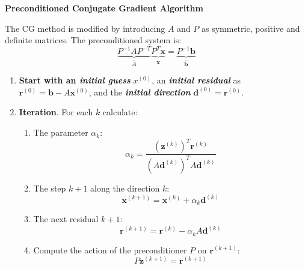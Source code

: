 \newpage

\begin{flushleft}
    \textcolor{Green3}{ \textbf{Preconditioned Conjugate Gradient Algorithm}}
\end{flushleft}
The CG method is modified by introducing $A$ and $P$ as symmetric, positive and definite matrices. The preconditioned system is:
\begin{equation*}
    \underbrace{P^{-1} A P^{-T}}_{\widehat{A}} \underbrace{P^{T} \mathbf{x}}_{\widehat{\mathbf{x}}} = \underbrace{P^{-1}\mathbf{b}}_{\widehat{\mathbf{b}}}
\end{equation*}
\begin{enumerate}
    \item \textbf{Start with an \emph{initial guess}} $x^{\left(0\right)}$, an \textbf{\emph{initial residual}} as $\mathbf{r}^{\left(0\right)} = \mathbf{b} - A\mathbf{x}^{\left(0\right)}$, and the \textbf{\emph{initial direction}} $\mathbf{d}^{\left(0\right)} = \mathbf{r}^{\left(0\right)}$.
    \item \textbf{Iteration}. For each $k$ calculate:
    \begin{enumerate}
        \item The parameter $\alpha_{k}$:
        \begin{equation}
            \alpha_{k} = \dfrac{
                \left(\mathbf{z}^{\left(k\right)}\right)^{T}\mathbf{r}^{\left(k\right)}
            }{
                \left(A\mathbf{d}^{\left(k\right)}\right)^{T}A\mathbf{d}^{\left(k\right)}
            }
        \end{equation}

        \item The step $k+1$ along the direction $k$:
        \begin{equation}
            \mathbf{x}^{\left(k+1\right)} = \mathbf{x}^{\left(k\right)} + \alpha_{k}\mathbf{d}^{\left(k\right)}
        \end{equation}

        \item The next residual $k+1$:
        \begin{equation}
            \mathbf{r}^{\left(k+1\right)} = \mathbf{r}^{\left(k\right)} - \alpha_{k}A\mathbf{d}^{\left(k\right)}
        \end{equation}

        \item Compute the action of the preconditioner $P$ on $\mathbf{r}^{\left(k+1\right)}$:
        \begin{equation}
            P\mathbf{z}^{\left(k+1\right)} = \mathbf{r}^{\left(k+1\right)}
        \end{equation}


\end{enumerate}
\end{enumerate}
